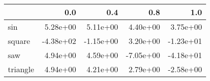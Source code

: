 \begin{tabular}{lrrrr}
\toprule
{} &       0.0 &       0.4 &       0.8 &       1.0 \\
\midrule
sin      &  5.28e+00 &  5.11e+00 &  4.40e+00 &  3.75e+00 \\
square   & -4.38e+02 & -1.15e+00 &  3.20e+00 & -1.23e+01 \\
saw      &  4.94e+00 &  4.59e+00 & -7.05e+00 & -4.18e+01 \\
triangle &  4.94e+00 &  4.21e+00 &  2.79e+00 & -2.58e+00 \\
\bottomrule
\end{tabular}
